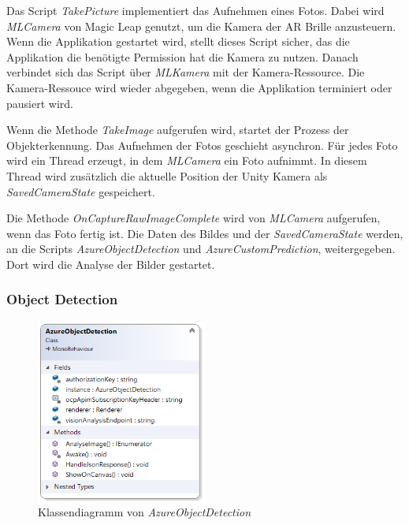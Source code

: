 
Das Script \textit{TakePicture} implementiert das Aufnehmen eines Fotos. Dabei wird \textit{MLCamera} von Magic Leap genutzt, um die Kamera der AR Brille anzusteuern. Wenn die Applikation gestartet wird, stellt dieses Script sicher, das die Applikation die benötigte Permission hat die Kamera zu nutzen. Danach verbindet sich das Script über \textit{MLKamera} mit der Kamera-Ressource. 
Die Kamera-Ressouce wird wieder abgegeben, wenn die Applikation terminiert oder pausiert wird.

Wenn die Methode \textit{TakeImage} aufgerufen wird, startet der Prozess der Objekterkennung.
Das Aufnehmen der Fotos geschieht asynchron. Für jedes Foto wird ein Thread erzeugt, in dem \textit{MLCamera} ein Foto aufnimmt. In diesem Thread wird zusätzlich die aktuelle Position der Unity Kamera als \textit{SavedCameraState} gespeichert.

Die Methode \textit{OnCaptureRawImageComplete} wird von \textit{MLCamera} aufgerufen, wenn das Foto fertig ist. Die Daten des Bildes und der \textit{SavedCameraState} werden, an die Scripts \textit{AzureObjectDetection} und \textit{AzureCustomPrediction}, weitergegeben. Dort wird die Analyse der Bilder gestartet. 

\subsubsection{Object Detection}

\begin{figure}[H]
	\centering
	\includegraphics[width=0.5\textwidth]{images/dia_azureobjectdetection.PNG}
	\caption[Klassendiagramm von \textit{AzureObjectDetection}]{Klassendiagramm von \textit{AzureObjectDetection}}
	\label{dia:azureobjectdetection}
\end{figure}

